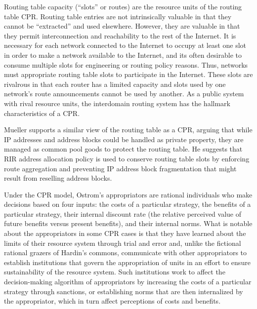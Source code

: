 Routing table capacity (``slots'' or routes) are the resource units of the
routing table CPR. Routing table entries are not intrinsically valuable in that
they cannot be ``extracted'' and used elsewhere. However, they are valuable in
that they permit interconnection and reachability to the rest of the Internet.
It is necessary for each network connected to the Internet to occupy at least
one slot in order to make a network available to the Internet, and its often
desirable to consume multiple slots for engineering or routing policy reasons.
Thus, networks must appropriate routing table slots to participate in the
Internet. These slots are rivalrous in that each router has a limited capacity
and slots used by one network's route announcements cannot be used by another.
As a public system with rival resource units, the interdomain routing system
has the hallmark characteristics of a CPR.

Mueller \cite{Mueller:2010bh} supports a similar view of the routing table as a
CPR, arguing that while IP addresses and address blocks could be handled as
private property, they are managed as common pool goods to protect the routing
table. He suggests that RIR address allocation policy is used to conserve
routing table slots by enforcing route aggregation and preventing IP address
block fragmentation that might result from reselling address blocks.

Under the CPR model, Ostrom's appropriators are rational individuals who make
decisions based on four inputs: the costs of a particular strategy, the
benefits of a particular strategy, their internal discount rate (the relative
perceived value of future benefits versus present benefits), and their internal
norms. What is notable about the appropriators in some CPR cases is that they
have learned about the limits of their resource system through trial and error
and, unlike the fictional rational grazers of Hardin's commons, communicate
with other appropriators to establish institutions that govern the
appropriation of units in an effort to ensure sustainability of the resource
system. Such institutions work to affect the decision-making algorithm of
appropriators by increasing the costs of a particular strategy through
sanctions, or establishing norms that are then internalized by the
appropriator, which in turn affect perceptions of costs and benefits.


